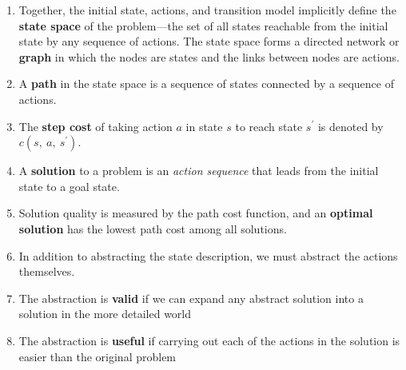 \begin{enumerate}
    \item Together, the initial state, actions, and transition model implicitly define the \textbf{state space} of the problem—the set of all states reachable from the initial state by any sequence of actions. The state space forms a directed network or \textbf{graph} in which the nodes are states and the links between nodes are actions.
    \hfill \cite{ai/book/Artificial-Intelligence-A-Modern-Approach/Russell-Norvig}

    \item A \textbf{path} in the state space is a sequence of states connected by a sequence of actions.
    \hfill \cite{ai/book/Artificial-Intelligence-A-Modern-Approach/Russell-Norvig}

    \item The \textbf{step cost} of taking action $a$ in state $s$ to reach state $s^\prime$ is denoted by $c(s,\ a,\ s^\prime)$.
    \hfill \cite{ai/book/Artificial-Intelligence-A-Modern-Approach/Russell-Norvig}

    \item A \textbf{solution} to a problem is an \textit{action sequence} that leads from the initial state to a goal state. 
    \hfill \cite{ai/book/Artificial-Intelligence-A-Modern-Approach/Russell-Norvig}
    
    \item Solution quality is measured by the path cost function, and an \textbf{optimal solution} has the lowest path cost among all solutions.
    \hfill \cite{ai/book/Artificial-Intelligence-A-Modern-Approach/Russell-Norvig}

    \item In addition to abstracting the state description, we must abstract the actions themselves.
    \hfill \cite{ai/book/Artificial-Intelligence-A-Modern-Approach/Russell-Norvig}

    \item The abstraction is \textbf{valid} if we can expand any abstract solution into a solution in the more detailed world
    \hfill \cite{ai/book/Artificial-Intelligence-A-Modern-Approach/Russell-Norvig}

    \item The abstraction is \textbf{useful} if carrying out each of the actions in the solution is easier than the original problem
    \hfill \cite{ai/book/Artificial-Intelligence-A-Modern-Approach/Russell-Norvig}
\end{enumerate}




